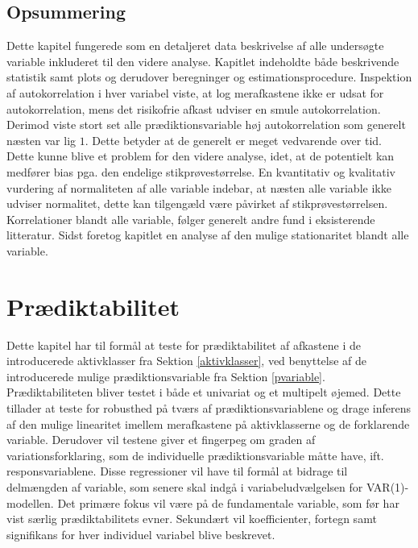 \documentclass[
  a4paper,
  oneside]{memoir}
\begin{document}
\begin{table}[H]
\begin{threeparttable}
\begin{tablenotes}
\end{tablenotes}
\end{threeparttable}
\end{table}

\hypertarget{ops}{%
\section{Opsummering}\label{ops}}

Dette kapitel fungerede som en detaljeret data beskrivelse af alle undersøgte variable inkluderet til den videre analyse. Kapitlet indeholdte både beskrivende statistik samt plots og derudover beregninger og estimationsprocedure. Inspektion af autokorrelation i hver variabel viste, at log merafkastene ikke er udsat for autokorrelation, mens det risikofrie afkast udviser en smule autokorrelation. Derimod viste stort set alle prædiktionsvariable høj autokorrelation som generelt næsten var lig \(1\). Dette betyder at de generelt er meget vedvarende over tid. Dette kunne blive et problem for den videre analyse, idet, at de potentielt kan medfører bias pga. den endelige stikprøvestørrelse. En kvantitativ og kvalitativ vurdering af normaliteten af alle variable indebar, at næsten alle variable ikke udviser normalitet, dette kan tilgengæld være påvirket af stikprøvestørrelsen. Korrelationer blandt alle variable, følger generelt andre fund i eksisterende litteratur. Sidst foretog kapitlet en analyse af den mulige stationaritet blandt alle variable.

\hypertarget{pruxe6diktabilitet}{%
\chapter{Prædiktabilitet}\label{pruxe6diktabilitet}}

Dette kapitel har til formål at teste for prædiktabilitet af afkastene i de introducerede aktivklasser fra Sektion \ref{aktivklasser}, ved benyttelse af de introducerede mulige prædiktionsvariable fra Sektion \ref{pvariable}. Prædiktabiliteten bliver testet i både et univariat og et multipelt øjemed. Dette tillader at teste for robusthed på tværs af prædiktionsvariablene og drage inferens af den mulige linearitet imellem merafkastene på aktivklasserne og de forklarende variable. Derudover vil testene giver et fingerpeg om graden af variationsforklaring, som de individuelle prædiktionsvariable måtte have, ift. responsvariablene. Disse regressioner vil have til formål at bidrage til delmængden af variable, som senere skal indgå i variabeludvælgelsen for VAR(1)-modellen. Det primære fokus vil være på de fundamentale variable, som før har vist særlig prædiktabilitets evner. Sekundært vil koefficienter, fortegn samt signifikans for hver individuel variabel blive beskrevet.
\end{document}
